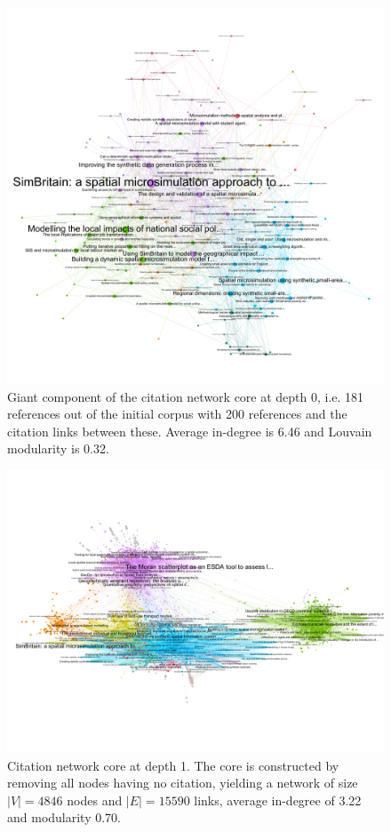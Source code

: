 \begin{figure}
  \includegraphics[width=\linewidth]{figures/microsim_depth0.png}
  \caption{Giant component of the citation network core at depth 0, i.e. 181 references out of the initial corpus with 200 references and the citation links between these. Average in-degree is 6.46 and Louvain modularity is 0.32.}
  \label{fig:citnwdepth0}
\end{figure}


\begin{figure}
  \includegraphics[width=\linewidth]{figures/microsim_depth1.png}
  \caption{Citation network core at depth 1. The core is constructed by removing all nodes having no citation, yielding a network of size $\left|V\right|=4846$ nodes and $\left|E\right|=15590$ links, average in-degree of 3.22 and modularity 0.70.}
  \label{fig:citnwdepth1}
\end{figure}

